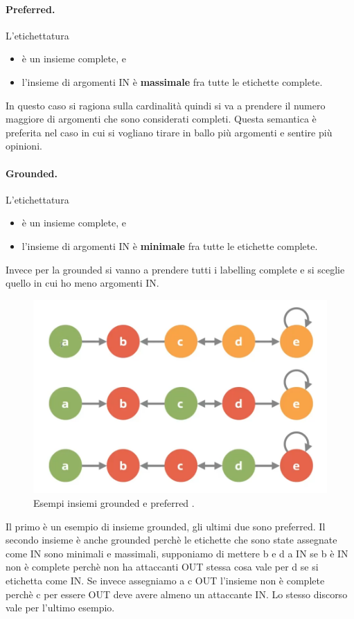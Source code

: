 \paragraph{Preferred.}
L'etichettatura
\begin{itemize}
    \item è un insieme complete, e 
    \item l'insieme di argomenti IN è \textbf{massimale} fra tutte le etichette complete.
\end{itemize}
In questo caso si ragiona sulla cardinalità quindi si va a prendere il numero maggiore di argomenti che sono considerati completi. Questa semantica è preferita nel caso in cui si vogliano tirare in ballo più argomenti e sentire più opinioni.

\paragraph{Grounded.}
L'etichettatura
\begin{itemize}
    \item è un insieme complete, e 
    \item l'insieme di argomenti IN è \textbf{minimale} fra tutte le etichette complete.
\end{itemize}
Invece per la grounded si vanno a prendere tutti i labelling complete e si sceglie quello in cui ho meno argomenti IN.

\begin{figure}[H]
    \centering
    \includegraphics[width=13cm, keepaspectratio]{img/grounded_preferred.png}
    \caption{Esempi insiemi grounded e preferred .}\label{fig:es_grounded_preferred}
\end{figure}
Il primo è un esempio di insieme grounded, gli ultimi due sono preferred. Il secondo insieme è anche grounded perchè le etichette che sono state assegnate come IN sono minimali e massimali, supponiamo di mettere b e d a IN se b è IN non è complete perchè non ha attaccanti OUT stessa cosa vale per d se si etichetta come IN. Se invece assegniamo a c OUT l'insieme non è complete perchè c per essere OUT deve avere almeno un attaccante IN. Lo stesso discorso vale per l'ultimo esempio.
